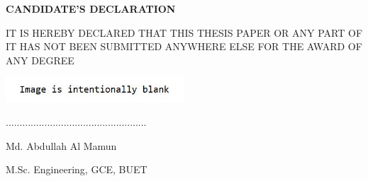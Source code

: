 \documentclass[main.tex]{subfiles}
\begin{document}
\centering

\vspace*{1.0cm}

\textbf{\uppercase{Candidate's declaration}}

\vspace{3.0cm}

\uppercase{It is hereby declared that this thesis paper or any part of it has not been submitted anywhere else for the award of any degree}

\vspace{5.0cm}

 \includegraphics[width=0.5\textwidth]{my_sign}

...................................................\\

\vspace{0.5cm}

Md. Abdullah Al Mamun\\

\vspace{0.5cm}

M.Sc. Engineering, GCE, BUET\\

\thispagestyle{fancy}
\newpage
\end{document}
